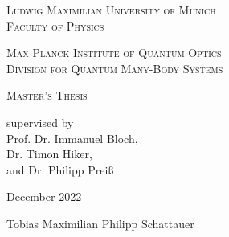 \begin{titlepage}
    \vspace*{\fill}
    \centering

    \textsc{\Large Ludwig Maximilian University of Munich}\\
    \textsc{Faculty of Physics}

    \vspace{1cm}

    \textsc{\Large Max Planck Institute of Quantum Optics}\\
    \textsc{Division for Quantum Many-Body Systems}

    \vspace{2.5cm}

    \begin{doublespace}
        \makeatletter
        \textsc{ \Huge \@title}
        \makeatother
    \end{doublespace}


    \vspace{2.5cm}
    \huge \textsc{Master's Thesis}



    \vspace{0.3cm}
    \large \textrm{supervised by\\Prof. Dr. Immanuel Bloch,\\Dr. Timon Hiker,\\and Dr. Philipp Preiß}

    \vspace{1.5cm}
    \huge
    \textrm{December 2022}

    \vspace{1.5cm}
    \Large \textrm{Tobias Maximilian Philipp Schattauer}

    \vspace*{\fill}
\end{titlepage}







